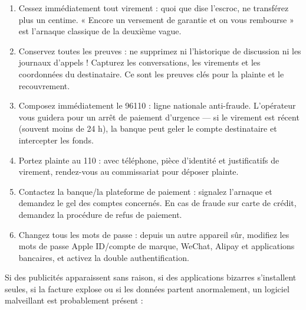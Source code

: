\begin{enumerate}
  \item Cessez immédiatement tout virement : quoi que dise l'escroc, ne transférez plus un centime. « Encore un versement de garantie et on vous rembourse » est l'arnaque classique de la deuxième vague.
  \item Conservez toutes les preuves : ne supprimez ni l'historique de discussion ni les journaux d'appels ! Capturez les conversations, les virements et les coordonnées du destinataire. Ce sont les preuves clés pour la plainte et le recouvrement.
  \item Composez immédiatement le 96110 : ligne nationale anti-fraude. L'opérateur vous guidera pour un arrêt de paiement d'urgence — si le virement est récent (souvent moins de 24 h), la banque peut geler le compte destinataire et intercepter les fonds.
  \item Portez plainte au 110 : avec téléphone, pièce d'identité et justificatifs de virement, rendez-vous au commissariat pour déposer plainte.
  \item Contactez la banque/la plateforme de paiement : signalez l'arnaque et demandez le gel des comptes concernés. En cas de fraude sur carte de crédit, demandez la procédure de refus de paiement.
  \item Changez tous les mots de passe : depuis un autre appareil sûr, modifiez les mots de passe Apple ID/compte de marque, WeChat, Alipay et applications bancaires, et activez la double authentification.
\end{enumerate}


Si des publicités apparaissent sans raison, si des applications bizarres s'installent seules, si la facture explose ou si les données partent anormalement, un logiciel malveillant est probablement présent :

